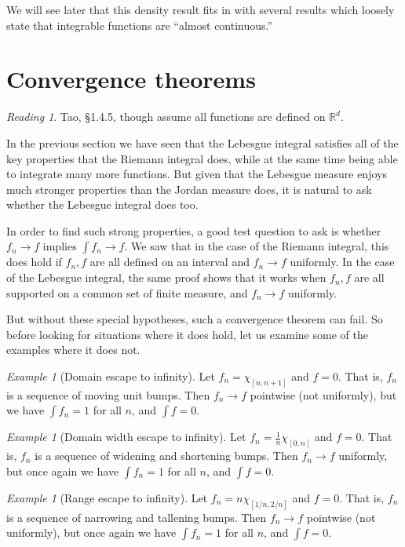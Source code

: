 \documentclass[11pt,oneside]{amsbook}
\newcommand{\RR}{{\mathbb R}}
\theoremstyle{definition}
\theoremstyle{plain}
\theoremstyle{definition}
\theoremstyle{remark}
\newtheorem{example}[thm]{Example}
\newtheorem*{reading}{Reading}
\numberwithin{equation}{section}
\numberwithin{figure}{section}
\begin{document}
We will see later that this density result fits in with several results which loosely state that integrable functions are ``almost continuous.''


\section{Convergence theorems}

\begin{reading}
  Tao, \S 1.4.5, though assume all functions are defined on $\RR^d$.
\end{reading}

In the previous section we have seen that the Lebesgue integral satisfies all of the key properties that the Riemann integral does, while at the same time being able to integrate many more functions. But given that the Lebesgue measure enjoys much stronger properties than the Jordan measure does, it is natural to ask whether the Lebesgue integral does too.

In order to find such strong properties, a good test question to ask is whether $f_n\to f$ implies $\int f_n\to f$. We saw that in the case of the Riemann integral, this does hold if $f_n,f$ are all defined on an interval and $f_n\to f$ uniformly. In the case of the Lebesgue integral, the same proof shows that it works when $f_n,f$ are all supported on a common set of finite measure, and $f_n\to f$ uniformly.

But without these special hypotheses, such a convergence theorem can fail. So before looking for situations where it does hold, let us examine some of the examples where it does not.

\begin{example}[Domain escape to infinity]
  Let $f_n=\chi_{[n,n+1]}$ and $f=0$. That is, $f_n$ is a sequence of moving unit bumps. Then $f_n\to f$ pointwise (not uniformly), but we have $\int f_n=1$ for all $n$, and $\int f=0$.
\end{example}

\begin{example}[Domain width escape to infinity]
  Let $f_n=\frac1n\chi_{[0,n]}$ and $f=0$. That is, $f_n$ is a sequence of widening and shortening bumps. Then $f_n\to f$ uniformly, but once again we have $\int f_n=1$ for all $n$, and $\int f=0$.
\end{example}

\begin{example}[Range escape to infinity]
  Let $f_n=n\chi_{[1/n,2/n]}$ and $f=0$. That is, $f_n$ is a sequence of narrowing and tallening bumps. Then $f_n\to f$ pointwise (not uniformly), but once again we have $\int f_n=1$ for all $n$, and $\int f=0$.
\end{example}
\end{document}
